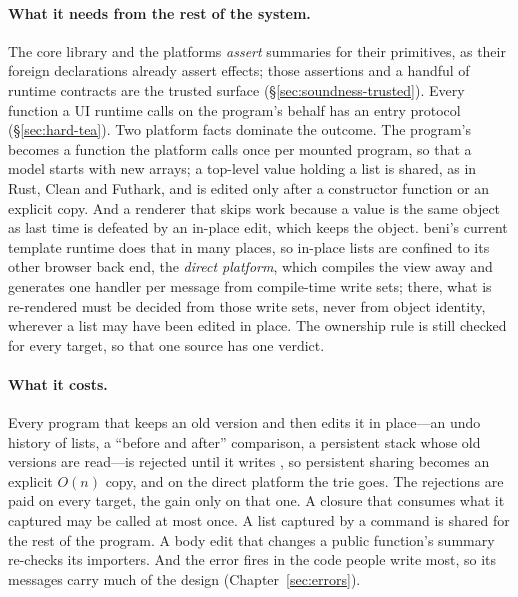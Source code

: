 \paragraph{What it needs from the rest of the system.} The core library and the platforms
\emph{assert} summaries for their primitives, as their foreign declarations already assert effects;
those assertions and a handful of runtime contracts are the trusted surface
(\S\ref{sec:soundness-trusted}). Every function a UI runtime calls on the program's behalf has an
entry protocol (\S\ref{sec:hard-tea}). Two platform facts dominate the outcome. The program's
 becomes a function the platform calls once per mounted program, so that a model starts
with new arrays; a top-level value holding a list is shared, as in Rust, Clean and Futhark, and is
edited only after a constructor function or an explicit copy. And a renderer that skips work because a
value is the same object as last time is defeated by an in-place edit, which keeps the object. beni's
current template runtime does that in many places, so in-place lists are confined to its other browser
back end, the \emph{direct platform}, which compiles the view away and generates one handler per message
from compile-time write sets; there, what is re-rendered must be decided from those write sets, never from
object identity, wherever a list may have been edited in place. The ownership rule is still checked for
every target, so that one source has one verdict.

\paragraph{What it costs.} Every program that keeps an old version and then edits it in place---an
undo history of lists, a ``before and after'' comparison, a persistent stack whose old versions are
read---is rejected until it writes , so persistent sharing becomes an explicit $O(n)$
copy, and on the direct platform the trie goes. The rejections are paid on every target, the gain only
on that one. A closure that consumes what it captured may be called at most once. A list captured by a
command is shared for the rest of the program. A body edit that changes a public function's summary
re-checks its importers. And the error fires in the code people write most, so its
messages carry much of the design (Chapter~\ref{sec:errors}).

